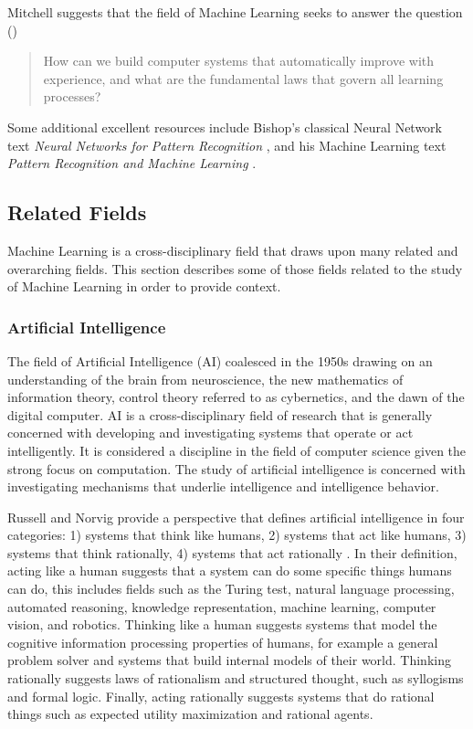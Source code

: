 \documentclass[a4paper, 11pt]{article}
\begin{document}
Mitchell suggests that the field of Machine Learning seeks to answer the question (\cite{Mitchell2006})

\begin{quotation}
How can we build computer systems that automatically improve with experience, and what are the fundamental laws that govern all learning processes?
\end{quotation}

Some additional excellent resources include Bishop's classical Neural Network text \emph{Neural Networks for Pattern Recognition} \cite{Bishop1995}, and his Machine Learning text \emph{Pattern Recognition and Machine Learning} \cite{Bishop2006}.

\subsection{Related Fields}
\label{subsec:related_fields}
Machine Learning is a cross-disciplinary field that draws upon many related and overarching fields. This section describes some of those fields related to the study of Machine Learning in order to provide context.

\subsubsection{Artificial Intelligence}
The field of Artificial Intelligence (AI) coalesced in the 1950s drawing on an understanding of the brain from neuroscience, the new mathematics of information theory, control theory referred to as cybernetics, and the dawn of the digital computer. AI is a cross-disciplinary field of research that is generally concerned with developing and investigating systems that operate or act intelligently. It is considered a discipline in the field of computer science given the strong focus on computation. The study of artificial intelligence is concerned with investigating mechanisms that underlie intelligence and intelligence behavior.

Russell and Norvig provide a perspective that defines artificial intelligence in four categories: 1) systems that think like humans, 2) systems that act like humans, 3) systems that think rationally, 4) systems that act rationally \cite{Russell2009}. In their definition, acting like a human suggests that a system can do some specific things humans can do, this includes fields such as the Turing test, natural language processing, automated reasoning, knowledge representation, machine learning, computer vision, and robotics. Thinking like a human suggests systems that model the cognitive information processing properties of humans, for example a general problem solver and systems that build internal models of their world. Thinking rationally suggests laws of rationalism and structured thought, such as syllogisms and formal logic. Finally, acting rationally suggests systems that do rational things such as expected utility maximization and rational agents. 
\end{document}
